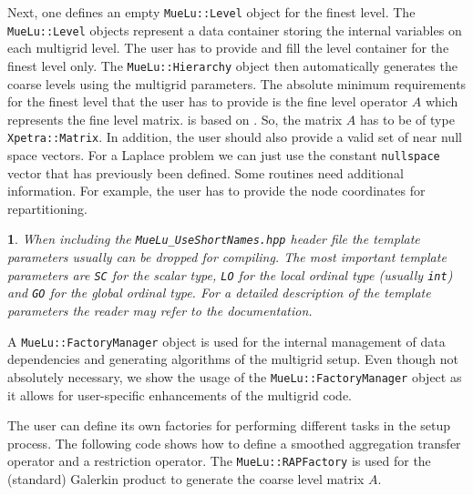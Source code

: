 \documentclass[10pt,fleqn]{book}
\newtheorem*{mycomment}{\ding{42}}
\providecommand\printCppListing[1]{

}
\begin{document}
Next, one defines an empty \texttt{MueLu::Level} object for the finest level. The \texttt{MueLu::Level} objects represent a data container storing the internal variables on each multigrid level. The user has to provide and fill the level container for the finest level only. The \texttt{MueLu::Hierarchy} object then automatically generates the coarse levels using the multigrid parameters. The absolute minimum requirements for the finest level that the user has to provide is the fine level operator $A$ which represents the fine level matrix. \muelu is based on \xpetra. So, the matrix $A$ has to be of type \texttt{Xpetra::Matrix}. In addition, the user should also provide a valid set of near null space vectors. For a Laplace problem we can just use the constant \texttt{nullspace} vector that has previously been defined. Some routines need additional information. For example, the user has to provide the node coordinates for repartitioning.
\printCppListing{ScalingTest.cpp_10.fragment}
\begin{mycomment}
When including the \texttt{MueLu\_UseShortNames.hpp} header file the template parameters usually can be dropped for compiling. The most important template parameters are \texttt{SC} for the scalar type, \texttt{LO} for the local ordinal type (usually \texttt{int}) and \texttt{GO} for the global ordinal type. For a detailed description of the template parameters the reader may refer to the \tpetra documentation.
\end{mycomment}

A \texttt{MueLu::FactoryManager} object is used for the internal management of data dependencies and generating algorithms of the multigrid setup. Even though not absolutely necessary, we show the usage of the \texttt{MueLu::FactoryManager} object as it allows for  user-specific enhancements of the multigrid code.
\printCppListing{ScalingTest.cpp_12.fragment}

The user can define its own factories for performing different tasks in the setup process. The following code shows how to define a smoothed aggregation transfer operator and a restriction operator. The \texttt{MueLu::RAPFactory} is used for the (standard) Galerkin product to generate the coarse level matrix $A$.
\printCppListing{ScalingTest.cpp_14.fragment}
\end{document}
